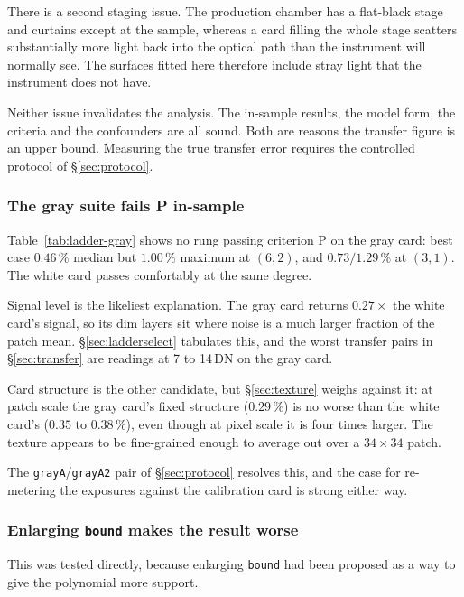 \documentclass[11pt, a4paper]{article}
\newcommand{\code}[1]{\texttt{#1}}
\newcommand{\pct}{\,\%}
\begin{document}
There is a second staging issue.
The production chamber has a flat-black stage and curtains
except at the sample,
whereas a card filling the whole stage
scatters substantially more light back into the optical path
than the instrument will normally see.
The surfaces fitted here therefore include stray light
that the instrument does not have.

Neither issue invalidates the analysis.
The in-sample results, the model form, the criteria
and the confounders are all sound.
Both are reasons the transfer figure is an upper bound.
Measuring the true transfer error requires the controlled protocol
of \S\ref{sec:protocol}.

\subsubsection{The gray suite fails P in-sample}
\label{sec:graypuzzle}

Table~\ref{tab:ladder-gray} shows no rung passing criterion P
on the gray card:
best case $0.46\pct$ median but $1.00\pct$ maximum at $(6,2)$,
and $0.73/1.29\pct$ at $(3,1)$.
The white card passes comfortably at the same degree.

Signal level is the likeliest explanation.
The gray card returns $0.27\times$ the white card's signal,
so its dim layers sit where noise is a much larger fraction
of the patch mean.
\S\ref{sec:ladderselect} tabulates this,
and the worst transfer pairs in \S\ref{sec:transfer}
are readings at 7 to 14\,DN on the gray card.

Card structure is the other candidate,
but \S\ref{sec:texture} weighs against it:
at patch scale the gray card's fixed structure
($0.29\pct$) is no worse than the white card's ($0.35$ to $0.38\pct$),
even though at pixel scale it is four times larger.
The texture appears to be fine-grained enough
to average out over a $34\times34$ patch.

The \code{grayA}/\code{grayA2} pair of \S\ref{sec:protocol}
resolves this,
and the case for re-metering the exposures against the calibration card
is strong either way.

\subsubsection{Enlarging \code{bound} makes the result worse}

This was tested directly,
because enlarging \code{bound} had been proposed
as a way to give the polynomial more support.
\end{document}
